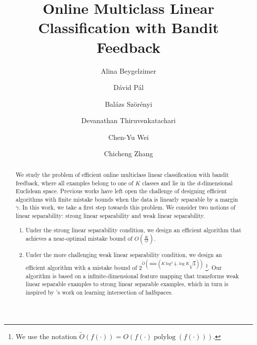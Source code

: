 \documentclass[12pt]{article}
\title{Online Multiclass Linear Classification with Bandit Feedback}
\author{
Alina Beygelzimer \and
D\'avid P\'al \and
Bal\'azs Sz\"or\'enyi \and
Devanathan Thiruvenkatachari \and
Chen-Yu Wei \and
Chicheng Zhang
}
\DeclareMathOperator*{\polylog}{polylog}
\begin{document}
\maketitle

\begin{abstract}
We study the problem of efficient online multiclass linear classification with
bandit feedback, where all examples belong to one of $K$ classes and lie in the
$d$-dimensional Euclidean space. Previous works have left open the challenge of
designing efficient algorithms with finite mistake bounds when the data is
linearly separable by a margin $\gamma$. In this work, we take a first step
towards this problem. We consider two notions of linear separability:
strong linear separability and weak linear separability.

\begin{enumerate}
\item Under the strong linear separability condition, we design an efficient
algorithm that achieves a near-optimal mistake bound of $O\left(\frac{K}{\gamma^2} \right)$.

\item Under the more challenging weak linear separability condition, we design
an efficient algorithm with a mistake bound of $2^{\widetilde{O}(\min(K \log^2
\frac{1}{\gamma}, \log K \sqrt{\frac 1 \gamma}))}$ \footnote{We use the notation
$\widetilde{O}(f(\cdot)) = O(f(\cdot) \polylog(f(\cdot)))$.}. Our algorithm is
based on a infinite-dimensional feature mapping that transforms weak
linear separable examples to strong linear separable examples, which in turn is inspired by
\cite{Klivans-Servedio-2008}'s work on learning intersection of halfspaces.
\end{enumerate}
\end{abstract}














\appendix


\end{document}
